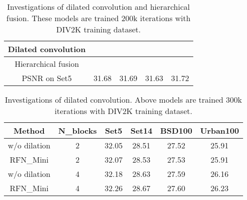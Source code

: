 \documentclass[preprint]{elsarticle}
\begin{document}
\begin{table}[htbp]
	\caption{Investigations of dilated convolution and hierarchical fusion. These models are trained 200k iterations with DIV2K training dataset.}
	\label{tab:ablation-study}
	\begin{center}
		\begin{tabular}{|c|c|c|c|c|}
			\hline
			Dilated convolution & \XSolidBrush & \XSolidBrush & \Checkmark & \Checkmark \\
			\hline
			Hierarchical fusion & \XSolidBrush & \Checkmark & \XSolidBrush & \Checkmark \\
			\hline
			\hline
			PSNR on Set5  & 31.68 & 31.69 & 31.63 & 31.72 \\
			\hline
		\end{tabular}
		
	\end{center}
\end{table}

\begin{table}[htb]
	\small
	\centering
	\caption{Investigations of dilated convolution. Above models are trained 300k iterations with DIV2K training dataset.}
	\label{tab:ablation-study-multi}
		\begin{tabular}{|c|c|c|c|c|c|}
			\hline
			Method & N\_blocks & Set5 & Set14 & BSD100 & Urban100 \\
			\hline
			w/o dilation & 2 & 32.05 & 28.51 & 27.52 & 25.91 \\
			RFN\_Mini & 2 & 32.07 & 28.53 & 27.53 & 25.91 \\
			\hline
			w/o dilation & 4 & 32.18 & 28.63 & 27.59 & 26.16 \\
			RFN\_Mini & 4 & 32.26 & 28.67 & 27.60 & 26.23 \\
			\hline 
	\end{tabular}
\end{table}
\end{document}
